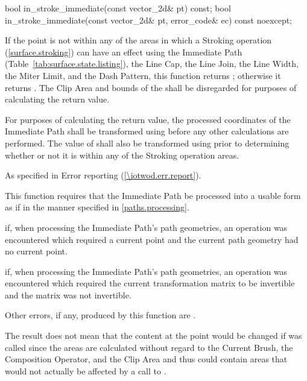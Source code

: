 \begin{itemdecl}
bool in_stroke_immediate(const vector_2d& pt) const;
bool in_stroke_immediate(const vector_2d& pt, error_code& ec) const noexcept;
\end{itemdecl}
\begin{itemdescr}
\pnum
\returns
If the point  is not within any of the areas in which a Stroking operation (\ref{surface.stroking}) can have an effect using the Immediate Path (Table~\ref{tab:surface.state.listing}), the Line Cap, the Line Join, the Line Width, the Miter Limit, and the Dash Pattern, this function returns ; otherwise it returns . The Clip Area and bounds of the \underlyingsurface shall be disregarded for purposes of calculating the return value.

\pnum
For purposes of calculating the return value, the processed coordinates of the Immediate Path shall be transformed using  before any other calculations are performed. The value of  shall also be transformed using  prior to determining whether or not it is within any of the Stroking operation areas.

\pnum
\throws
As specified in Error reporting (\ref{\iotwod.err.report}).

\pnum
\remarks
This function requires that the Immediate Path be processed into a usable form as if in the manner specified in \ref{paths.processing}.

\pnum
\errors
{} if, when processing the Immediate Path's path geometries, an operation was encountered which required a current point and the current path geometry had no current point.

\pnum
{} if, when processing the Immediate Path's path geometries, an operation was encountered which required the current transformation matrix to be invertible and the matrix was not invertible.

\pnum
Other errors, if any, produced by this function are .

\pnum
\realnotes
The result does not mean that the content at the point  would be changed if  was called since the areas are calculated without regard to the Current Brush, the Composition Operator, and the Clip Area and thus could contain areas that would not actually be affected by a call to .
\end{itemdescr}

